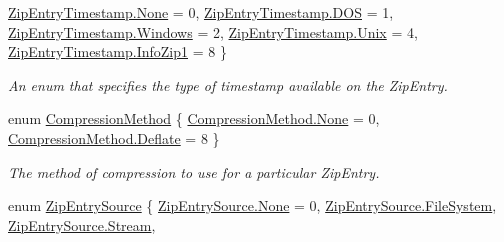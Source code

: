 \begin{DoxyCompactItemize}
\mbox{\hyperlink{namespace_super_tiled2_unity_1_1_ionic_1_1_zip_afa5034d6b4915c0633b590a28622f7fda6adf97f83acf6453d4a6a4b1070f3754}{Zip\+Entry\+Timestamp.\+None}} = 0, 
\mbox{\hyperlink{namespace_super_tiled2_unity_1_1_ionic_1_1_zip_afa5034d6b4915c0633b590a28622f7fdaa58e0423869da99d6ca169de8a000cc7}{Zip\+Entry\+Timestamp.\+D\+OS}} = 1, 
\mbox{\hyperlink{namespace_super_tiled2_unity_1_1_ionic_1_1_zip_afa5034d6b4915c0633b590a28622f7fdaaea23489ce3aa9b6406ebb28e0cda430}{Zip\+Entry\+Timestamp.\+Windows}} = 2, 
\mbox{\hyperlink{namespace_super_tiled2_unity_1_1_ionic_1_1_zip_afa5034d6b4915c0633b590a28622f7fda6ec1bd1ea6a5d67a63b20c8f6172bddd}{Zip\+Entry\+Timestamp.\+Unix}} = 4, 
\newline
\mbox{\hyperlink{namespace_super_tiled2_unity_1_1_ionic_1_1_zip_afa5034d6b4915c0633b590a28622f7fda25d1dd2095cb171345c14d53d73c7c22}{Zip\+Entry\+Timestamp.\+Info\+Zip1}} = 8
 \}
\begin{DoxyCompactList}\small\item\em An enum that specifies the type of timestamp available on the Zip\+Entry. \end{DoxyCompactList}\item 
enum \mbox{\hyperlink{namespace_super_tiled2_unity_1_1_ionic_1_1_zip_a48fd7a4529dd87fb2fda54f62ae3d8a3}{Compression\+Method}} \{ \mbox{\hyperlink{namespace_super_tiled2_unity_1_1_ionic_1_1_zip_a48fd7a4529dd87fb2fda54f62ae3d8a3a6adf97f83acf6453d4a6a4b1070f3754}{Compression\+Method.\+None}} = 0, 
\mbox{\hyperlink{namespace_super_tiled2_unity_1_1_ionic_1_1_zip_a48fd7a4529dd87fb2fda54f62ae3d8a3ae2430ff724c45c3d68893fb1a3584426}{Compression\+Method.\+Deflate}} = 8
 \}
\begin{DoxyCompactList}\small\item\em The method of compression to use for a particular Zip\+Entry. \end{DoxyCompactList}\item 
enum \mbox{\hyperlink{namespace_super_tiled2_unity_1_1_ionic_1_1_zip_a9ced5352c56e7e0fceff15b534073c83}{Zip\+Entry\+Source}} \{ \newline
\mbox{\hyperlink{namespace_super_tiled2_unity_1_1_ionic_1_1_zip_a9ced5352c56e7e0fceff15b534073c83a6adf97f83acf6453d4a6a4b1070f3754}{Zip\+Entry\+Source.\+None}} = 0, 
\mbox{\hyperlink{namespace_super_tiled2_unity_1_1_ionic_1_1_zip_a9ced5352c56e7e0fceff15b534073c83ae2d63d195b2bce9c8d5bf797a268bcec}{Zip\+Entry\+Source.\+File\+System}}, 
\mbox{\hyperlink{namespace_super_tiled2_unity_1_1_ionic_1_1_zip_a9ced5352c56e7e0fceff15b534073c83aeae835e83c0494a376229f254f7d3392}{Zip\+Entry\+Source.\+Stream}}, 

\end{DoxyCompactItemize}
